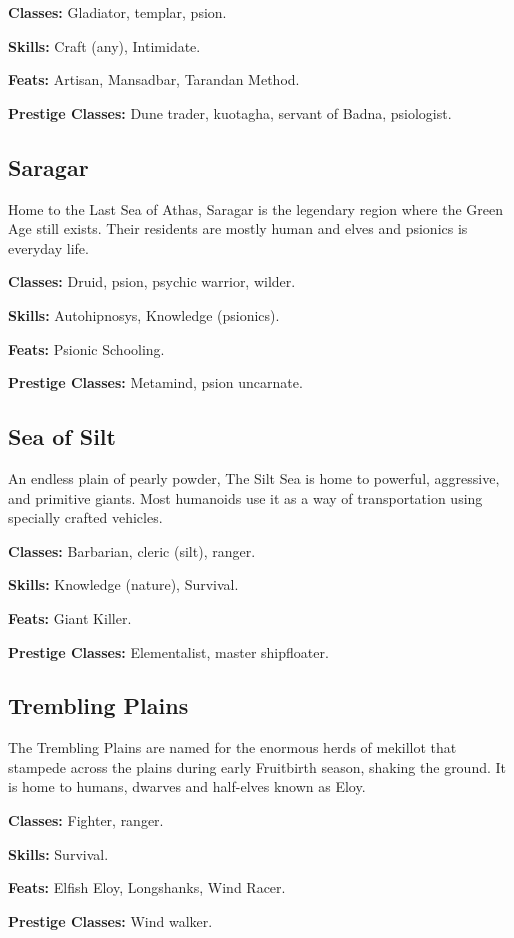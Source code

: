 \textbf{Classes:} Gladiator, templar, psion.

\textbf{Skills:} Craft (any), Intimidate.

\textbf{Feats:} Artisan, Mansadbar, Tarandan Method.

\textbf{Prestige Classes:} Dune trader, kuotagha, servant of Badna, psiologist.

\subsection{Saragar}
Home to the Last Sea of Athas, Saragar is the legendary region where the Green Age still exists. Their residents are mostly human and elves and psionics is everyday life.

\textbf{Classes:} Druid, psion, psychic warrior, wilder.

\textbf{Skills:} Autohipnosys, Knowledge (psionics).

\textbf{Feats:} Psionic Schooling.

\textbf{Prestige Classes:} Metamind, psion uncarnate.


\subsection{Sea of Silt}
An endless plain of pearly powder, The Silt Sea is home to powerful, aggressive, and primitive giants. Most humanoids use it as a way of transportation using specially crafted vehicles.

\textbf{Classes:} Barbarian, cleric (silt), ranger.

\textbf{Skills:} Knowledge (nature), Survival.

\textbf{Feats:} Giant Killer.

\textbf{Prestige Classes:} Elementalist, master shipfloater.


\subsection{Trembling Plains}
The Trembling Plains are named for the enormous herds of mekillot that stampede across the plains during early Fruitbirth season, shaking the ground. It is home to humans, dwarves and half-elves known as Eloy.

\textbf{Classes:} Fighter, ranger.

\textbf{Skills:} Survival.

\textbf{Feats:} Elfish Eloy, Longshanks, Wind Racer.

\textbf{Prestige Classes:} Wind walker.


